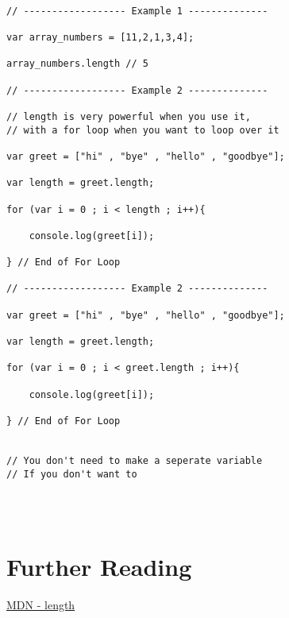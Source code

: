 \documentclass[12pt, letterpaper]{article}
\begin{document}
\begin{lstlisting}

// ------------------ Example 1 --------------

var array_numbers = [11,2,1,3,4];

array_numbers.length // 5		

// ------------------ Example 2 --------------

// length is very powerful when you use it,
// with a for loop when you want to loop over it

var greet = ["hi" , "bye" , "hello" , "goodbye"];

var length = greet.length;

for (var i = 0 ; i < length ; i++){

	console.log(greet[i]);

} // End of For Loop

// ------------------ Example 2 --------------

var greet = ["hi" , "bye" , "hello" , "goodbye"];

var length = greet.length;

for (var i = 0 ; i < greet.length ; i++){

	console.log(greet[i]);

} // End of For Loop


// You don't need to make a seperate variable
// If you don't want to


		
\end{lstlisting}

\section*{Further Reading}

\href{https://developer.mozilla.org/en-US/docs/Web/JavaScript/Reference/Global_Objects/Array/length}{MDN - length}
\end{document}
